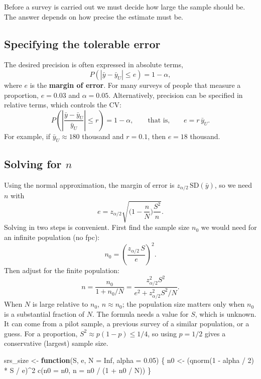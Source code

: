 \documentclass[
  letterpaper,
  DIV=11,
  numbers=noendperiod]{scrreprt}
\newenvironment{Shaded}{\begin{snugshade}}{\end{snugshade}}
\newcommand{\AttributeTok}[1]{\textcolor[rgb]{0.40,0.45,0.13}{#1}}
\newcommand{\ConstantTok}[1]{\textcolor[rgb]{0.56,0.35,0.01}{#1}}
\newcommand{\ControlFlowTok}[1]{\textcolor[rgb]{0.00,0.23,0.31}{\textbf{#1}}}
\newcommand{\DecValTok}[1]{\textcolor[rgb]{0.68,0.00,0.00}{#1}}
\newcommand{\FloatTok}[1]{\textcolor[rgb]{0.68,0.00,0.00}{#1}}
\newcommand{\FunctionTok}[1]{\textcolor[rgb]{0.28,0.35,0.67}{#1}}
\newcommand{\NormalTok}[1]{\textcolor[rgb]{0.00,0.23,0.31}{#1}}
\newcommand{\OtherTok}[1]{\textcolor[rgb]{0.00,0.23,0.31}{#1}}
\newcommand{\SpecialCharTok}[1]{\textcolor[rgb]{0.37,0.37,0.37}{#1}}
\renewcommand{\[}{\begin{equation}}
\renewcommand{\]}{\end{equation}}
\begin{document}
Before a survey is carried out we must decide how large the sample
should be. The answer depends on how precise the estimate must be.

\subsection{Specifying the tolerable
error}\label{specifying-the-tolerable-error}

The desired precision is often expressed in absolute terms, \[
P(|\bar y - \bar y_{U}| \le e) = 1-\alpha ,
\] where \(e\) is the \textbf{margin of error}. For many surveys of
people that measure a proportion, \(e=0.03\) and \(\alpha=0.05\).
Alternatively, precision can be specified in relative terms, which
controls the CV: \[
P\left(\left|\frac{\bar y - \bar y_{U}}{\bar y_{U}}\right| \le r\right) = 1-\alpha,
\qquad\text{that is,}\qquad e = r \, \bar y_{U} .
\] For example, if \(\bar y_{U} \approx 180\) thousand and \(r=0.1\),
then \(e=18\) thousand.

\subsection{\texorpdfstring{Solving for
\(n\)}{Solving for n}}\label{solving-for-n}

Using the normal approximation, the margin of error is
\(z_{\alpha/2}\,\mathrm{SD}(\bar y)\), so we need \(n\) with \[
e = z_{\alpha/2}\sqrt{\Big(1-\frac nN\Big)\frac{S^2}{n}} .
\] Solving in two steps is convenient. First find the sample size
\(n_0\) we would need for an infinite population (no fpc): \[
n_0 = \left(\frac{z_{\alpha/2}\, S}{e}\right)^{\!2}.
\] Then adjust for the finite population: \[
\boxed{n = \frac{n_0}{1+n_0/N} = \frac{z_{\alpha/2}^2 S^2}{e^2 + z_{\alpha/2}^2 S^2/N}.}
\] When \(N\) is large relative to \(n_0\), \(n \approx n_0\); the
population size matters only when \(n_0\) is a substantial fraction of
\(N\). The formula needs a value for \(S\), which is unknown. It can
come from a pilot sample, a previous survey of a similar population, or
a guess. For a proportion, \(S^2 \approx p(1-p) \le 1/4\), so using
\(p = 1/2\) gives a conservative (largest) sample size.

\begin{Shaded}
\begin{Highlighting}[]
\NormalTok{srs\_size }\OtherTok{\textless{}{-}} \ControlFlowTok{function}\NormalTok{(S, e, }\AttributeTok{N =} \ConstantTok{Inf}\NormalTok{, }\AttributeTok{alpha =} \FloatTok{0.05}\NormalTok{) \{}
\NormalTok{  n0 }\OtherTok{\textless{}{-}}\NormalTok{ (}\FunctionTok{qnorm}\NormalTok{(}\DecValTok{1} \SpecialCharTok{{-}}\NormalTok{ alpha }\SpecialCharTok{/} \DecValTok{2}\NormalTok{) }\SpecialCharTok{*}\NormalTok{ S }\SpecialCharTok{/}\NormalTok{ e)}\SpecialCharTok{\^{}}\DecValTok{2}
  \FunctionTok{c}\NormalTok{(}\AttributeTok{n0 =}\NormalTok{ n0, }\AttributeTok{n =}\NormalTok{ n0 }\SpecialCharTok{/}\NormalTok{ (}\DecValTok{1} \SpecialCharTok{+}\NormalTok{ n0 }\SpecialCharTok{/}\NormalTok{ N))}
\NormalTok{\}}
\end{Highlighting}
\end{Shaded}
\end{document}
